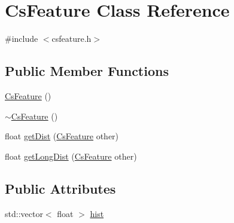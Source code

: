 \hypertarget{class_cs_feature}{\section{\-Cs\-Feature \-Class \-Reference}
\label{class_cs_feature}
}


{\ttfamily \#include $<$csfeature.\-h$>$}

\subsection*{\-Public \-Member \-Functions}
\begin{DoxyCompactItemize}
\item 
\hyperlink{class_cs_feature_a1eed361a447e5ad1c6a64944d8e8de35}{\-Cs\-Feature} ()
\item 
\hyperlink{class_cs_feature_aa8e8330d3b52d6e76cfb91b464144b8d}{$\sim$\-Cs\-Feature} ()
\item 
float \hyperlink{class_cs_feature_aab7354d73d0a95f136de349dc33c6509}{get\-Dist} (\hyperlink{class_cs_feature}{\-Cs\-Feature} other)
\item 
float \hyperlink{class_cs_feature_aed2d0853eb391024d9bb48300a4300a4}{get\-Long\-Dist} (\hyperlink{class_cs_feature}{\-Cs\-Feature} other)
\end{DoxyCompactItemize}
\subsection*{\-Public \-Attributes}
\begin{DoxyCompactItemize}
\item 
std\-::vector$<$ float $>$ \hyperlink{class_cs_feature_ab2e8bb8a3f95b4b38b8c8d81f6e08a53}{hist}
\end{DoxyCompactItemize}


